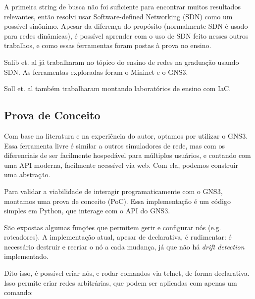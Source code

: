 \documentclass[12pt]{article}
\begin{document}
A primeira string de busca não foi suficiente para encontrar muitos resultados
relevantes, então resolvi usar Software-defined Networking (SDN) como um
possível sinônimo. Apesar da diferença do propósito (normalmente SDN é usado
para redes dinâmicas\cite{vsuh2017designing}), é possível aprender com o uso de
SDN feito nesses outros trabalhos, e como essas ferramentas foram postas à
prova no ensino\cite{salib2018hands}.

Salib et. al\cite{salib2018hands} já trabalharam no tópico do ensino de redes
na graduação usando SDN. As ferramentas exploradas foram o
Mininet\cite{mininet} e o GNS3\cite{gns3api}.

Soll et. al\cite{soll2023building} também trabalharam montando laboratórios de ensino com IaC.



\subsection{Prova de Conceito}

Com base na literatura e na experiência do autor, optamos por utilizar o
GNS3\cite{gns3api}. Essa ferramenta livre é similar a outros simuladores de
rede, mas com os diferenciais de ser facilmente hospedável para múltiplos
usuários, e contando com uma API moderna, facilmente acessível via web. Com
ela, podemos construir uma abstração.

Para validar a viabilidade de interagir programaticamente com o GNS3, montamos
uma prova de conceito (PoC). Essa implementação é um código simples em Python,
que interage com o API do GNS3\cite{gns3api}.

São expostas algumas funções que permitem gerir e configurar nós (e.g.
roteadores). A implementação atual, apesar de declarativa, é rudimentar: é
necessário destruir e recriar o nó a cada mudança, já que não há \textit{drift
detection} implementado.

Dito isso, é possível criar nós, e rodar comandos via telnet, de forma
declarativa. Isso permite criar redes arbitrárias, que podem ser aplicadas com
apenas um comando:
\end{document}
